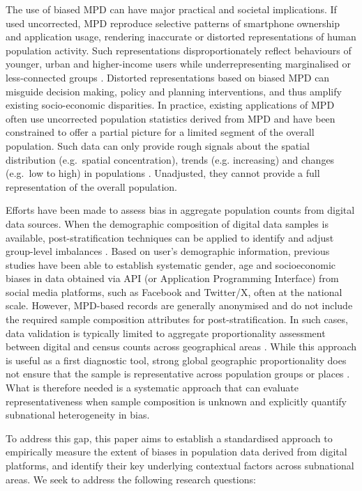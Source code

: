 \documentclass[]{rsos}%
\begin{document}
The use of biased MPD can have major practical and societal
implications. If used uncorrected, MPD reproduce selective patterns of
smartphone ownership and application usage, rendering inaccurate or
distorted representations of human population activity. Such
representations disproportionately reflect behaviours of younger, urban
and higher-income users while underrepresenting marginalised or
less-connected groups \citep{porter2012, wesolowski13-biases}. Distorted
representations based on biased MPD can misguide decision making, policy
and planning interventions, and thus amplify existing socio-economic
disparities. In practice, existing applications of MPD often use
uncorrected population statistics derived from MPD and have been
constrained to offer a partial picture for a limited segment of the
overall population. Such data can only provide rough signals about the
spatial distribution (e.g.~spatial concentration), trends (e.g.
increasing) and changes (e.g.~low to high) in populations
\citep{rowe22-sensing-ukraine}. Unadjusted, they cannot provide a full
representation of the overall population.

Efforts have been made to assess bias in aggregate population counts
from digital data sources. When the demographic composition of digital
data samples is available, post-stratification techniques can be applied
to identify and adjust group-level imbalances \citep{ribeiro20-facebook, gil-clavel2019}. Based on user's demographic information, previous
studies have been able to establish systematic gender, age and
socioeconomic biases in data obtained via API (or Application
Programming Interface) from social media platforms, such as Facebook and
Twitter/X, often at the national scale. However, MPD-based records are
generally anonymised and do not include the required sample composition
attributes for post-stratification. In such cases, data validation is
typically limited to aggregate proportionality assessment between
digital and census counts across geographical areas \citep{renninger2026, wang2022, moro2021, cabrera25}. While this approach is useful as a
first diagnostic tool, strong global geographic proportionality does not
ensure that the sample is representative across population groups or
places \citep{rowe2021using, iradukunda2025estimating, sinclair23}. What is therefore
needed is a systematic approach that can evaluate representativeness
when sample composition is unknown and explicitly quantify subnational
heterogeneity in bias.

To address this gap, this paper aims to establish a standardised
approach to empirically measure the extent of biases in population data
derived from digital platforms, and identify their key underlying
contextual factors across subnational areas. We seek to address the
following research questions:
\end{document}
